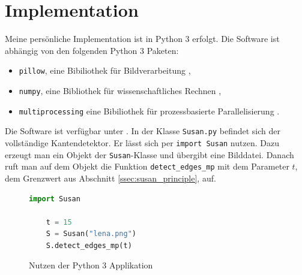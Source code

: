 \documentclass[a4paper, 11pt]{report}
\theoremstyle{definition}
\begin{document}
		\section{Implementation}\label{sec:implementation}
		Meine persönliche Implementation ist in Python 3 erfolgt. Die Software ist abhängig von den folgenden Python 3 Paketen:
		\begin{itemize}
			\item \texttt{pillow}, eine Bibiliothek für Bildverarbeitung \cite{pillow},
			\item \texttt{numpy}, eine Bibliothek für wissenschaftliches Rechnen \cite{numpy},
			\item \texttt{multiprocessing} eine Bibiliothek für prozessbasierte Parallelisierung \cite{multiprocessing}.
		\end{itemize}
		Die Software ist verfügbar unter \cite{mysoftware}. In der Klasse \texttt{Susan.py} befindet sich der vollständige Kantendetektor. Er lässt sich per \texttt{import Susan} nutzen. Dazu erzeugt man ein Objekt der \texttt{Susan}-Klasse und übergibt eine Bilddatei. Danach ruft man auf dem Objekt die Funktion \texttt{detect\_edges\_mp} mit dem Parameter $t$, dem Grenzwert aus Abschnitt \ref{ssec:susan_principle}, auf.

		\begin{figure}[H] \centering
			\begin{lstlisting}[language=Python]
	import Susan

	t = 15
	S = Susan("lena.png")
	S.detect_edges_mp(t)
			\end{lstlisting}
		\caption{Nutzen der Python 3 Applikation}
		\label{fig:minimal-working-example}
		\end{figure}
\end{document}
